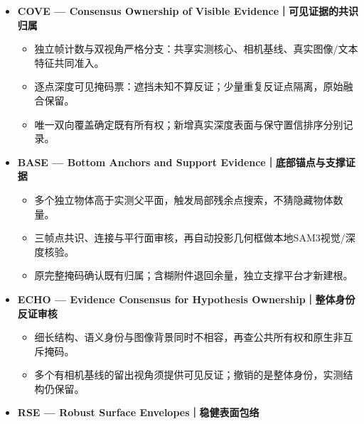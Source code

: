 \documentclass[UTF8,fontset=fandol]{ctexart}
\begin{document}
\begin{itemize}
\begin{itemize}
\begin{itemize}
\begin{itemize}
\item 原图像素、相机基线和三帧逐点验证共同准入，已拥有表面抑制重复根。

\end{itemize}

\item \textbf{COVE — Consensus Ownership of Visible Evidence｜可见证据的共识归属}


\begin{itemize}
\item 独立帧计数与双视角严格分支：共享实测核心、相机基线、真实图像/文本特征共同准入。


\item 逐点深度可见掩码票：遮挡未知不算反证；少量重复反证点隔离，原始融合保留。


\item 唯一双向覆盖确定既有所有权；新增真实深度表面与保守置信排序分别记录。

\end{itemize}

\item \textbf{BASE — Bottom Anchors and Support Evidence｜底部锚点与支撑证据}


\begin{itemize}
\item 多个独立物体高于实测父平面，触发局部残余点搜索，不猜隐藏物体数量。


\item 三帧点共识、连接与平行面审核，再自动投影几何框做本地SAM3视觉/深度核验。


\item 原完整掩码确认既有归属；含糊附件退回余量，独立支撑平台才新建根。

\end{itemize}

\item \textbf{ECHO — Evidence Consensus for Hypothesis Ownership｜整体身份反证审核}


\begin{itemize}
\item 细长结构、语义身份与图像背景同时不相容，再查公共所有权和原生非互斥掩码。


\item 多个有相机基线的留出视角须提供可见反证；撤销的是整体身份，实测结构仍保留。

\end{itemize}

\item \textbf{RSE — Robust Surface Envelopes｜稳健表面包络}



\end{itemize}
\end{itemize}
\end{itemize}
\end{document}
